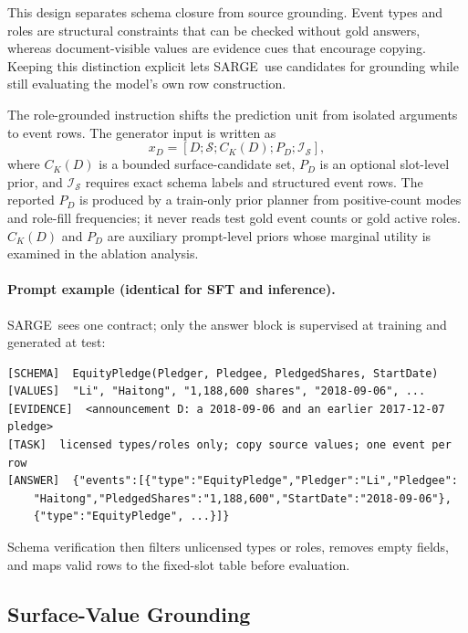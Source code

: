 \documentclass[runningheads]{llncs}
\newcommand{\method}{SARGE}
\begin{document}
This design separates schema closure from source grounding. Event types and roles are structural constraints that can be checked without gold answers, whereas document-visible values are evidence cues that encourage copying. Keeping this distinction explicit lets \method\ use candidates for grounding while still evaluating the model's own row construction.

The role-grounded instruction shifts the prediction unit from isolated arguments to event rows. The generator input is written as
\begin{equation}
x_D=\left[D;\mathcal{S};C_K(D);P_D;\mathcal{I}_{\mathcal{S}}\right],
\label{eq:prompt-interface}
\end{equation}
where $C_K(D)$ is a bounded surface-candidate set, $P_D$ is an optional slot-level prior, and $\mathcal{I}_{\mathcal{S}}$ requires exact schema labels and structured event rows. The reported $P_D$ is produced by a train-only prior planner from positive-count modes and role-fill frequencies; it never reads test gold event counts or gold active roles. $C_K(D)$ and $P_D$ are auxiliary prompt-level priors whose marginal utility is examined in the ablation analysis.

\paragraph{Prompt example (identical for SFT and inference).} \method\ sees one contract; only the answer block is supervised at training and generated at test:
{\scriptsize
\begin{verbatim}
[SCHEMA]  EquityPledge(Pledger, Pledgee, PledgedShares, StartDate)
[VALUES]  "Li", "Haitong", "1,188,600 shares", "2018-09-06", ...
[EVIDENCE]  <announcement D: a 2018-09-06 and an earlier 2017-12-07 pledge>
[TASK]  licensed types/roles only; copy source values; one event per row
[ANSWER]  {"events":[{"type":"EquityPledge","Pledger":"Li","Pledgee":
    "Haitong","PledgedShares":"1,188,600","StartDate":"2018-09-06"},
    {"type":"EquityPledge", ...}]}
\end{verbatim}}
Schema verification then filters unlicensed types or roles, removes empty fields, and maps valid rows to the fixed-slot table before evaluation.

\subsection{Surface-Value Grounding}
\end{document}

